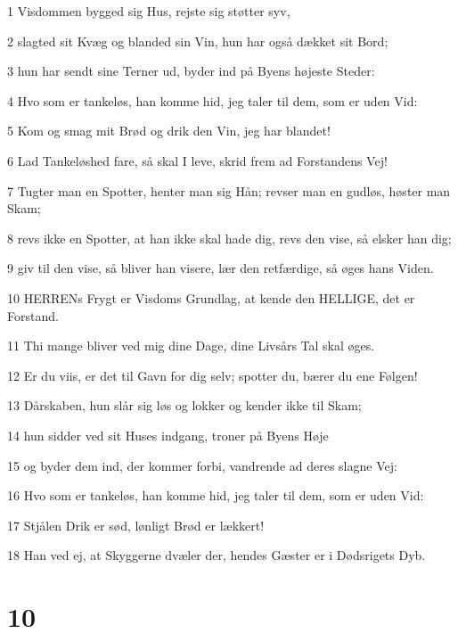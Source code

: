 \par 1 Visdommen bygged sig Hus, rejste sig støtter syv,
\par 2 slagted sit Kvæg og blanded sin Vin, hun har også dækket sit Bord;
\par 3 hun har sendt sine Terner ud, byder ind på Byens højeste Steder:
\par 4 Hvo som er tankeløs, han komme hid, jeg taler til dem, som er uden Vid:
\par 5 Kom og smag mit Brød og drik den Vin, jeg har blandet!
\par 6 Lad Tankeløshed fare, så skal I leve, skrid frem ad Forstandens Vej!
\par 7 Tugter man en Spotter, henter man sig Hån; revser man en gudløs, høster man Skam;
\par 8 revs ikke en Spotter, at han ikke skal hade dig, revs den vise, så elsker han dig;
\par 9 giv til den vise, så bliver han visere, lær den retfærdige, så øges hans Viden.
\par 10 HERRENs Frygt er Visdoms Grundlag, at kende den HELLIGE, det er Forstand.
\par 11 Thi mange bliver ved mig dine Dage, dine Livsårs Tal skal øges.
\par 12 Er du viis, er det til Gavn for dig selv; spotter du, bærer du ene Følgen!
\par 13 Dårskaben, hun slår sig løs og lokker og kender ikke til Skam;
\par 14 hun sidder ved sit Huses indgang, troner på Byens Høje
\par 15 og byder dem ind, der kommer forbi, vandrende ad deres slagne Vej:
\par 16 Hvo som er tankeløs, han komme hid, jeg taler til dem, som er uden Vid:
\par 17 Stjålen Drik er sød, lønligt Brød er lækkert!
\par 18 Han ved ej, at Skyggerne dvæler der, hendes Gæster er i Dødsrigets Dyb.

\chapter{10}

